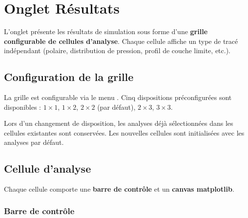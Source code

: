 \chapter{Onglet Résultats}
\label{chap:resultats}

L'onglet  présente les résultats de simulation
sous forme d'une \textbf{grille configurable de cellules
d'analyse}. Chaque cellule affiche un type de tracé indépendant
(polaire, distribution de pression, profil de couche limite,
etc.).



\section{Configuration de la grille}

La grille est configurable via le menu
. Cinq dispositions
préconfigurées sont disponibles : $1\times1$, $1\times2$,
$2\times2$ (par défaut), $2\times3$, $3\times3$.

\begin{noteinfo}
Lors d'un changement de disposition, les analyses déjà
sélectionnées dans les cellules existantes sont conservées.
Les nouvelles cellules sont initialisées avec les analyses
par défaut.
\end{noteinfo}

\section{Cellule d'analyse}

Chaque cellule comporte une \textbf{barre de contrôle} et un
\textbf{canvas matplotlib}.

\subsection{Barre de contrôle}


